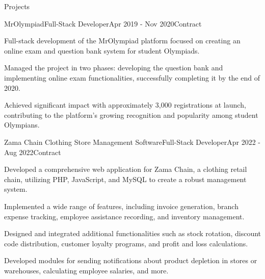\documentclass[]{kyvernitis-resume}
\begin{document}
\begin{section}{Projects}
    \begin{subsection}{MrOlympiad}{Full-Stack Developer}{Apr 2019 - Nov 2020}{Contract}{}
		\item Full-stack development of the MrOlympiad platform  
 focused on creating an online exam and question bank system for student Olympiads.
		\item Managed the project in two phases: developing the question bank and implementing online exam functionalities, successfully completing it by the end of 2020.
		\item Achieved significant impact with approximately 3,000 registrations at launch, contributing to the platform’s growing recognition and popularity among student Olympians.

    \end{subsection}
    \begin{subsection}{Zama Chain Clothing Store Management Software}{Full-Stack Developer}{Apr 2022 - Aug 2022}{Contract}{}
		\item Developed a comprehensive web application for Zama Chain, a clothing retail chain, utilizing PHP, JavaScript, and MySQL to create a robust management system.
		\item Implemented a wide range of features, including invoice generation, branch expense tracking, employee assistance recording, and inventory management.
		\item Designed and integrated additional functionalities such as stock rotation, discount code distribution, customer loyalty programs, and profit and loss calculations.
		\item Developed modules for sending notifications about product depletion in stores or warehouses, calculating employee salaries, and more.


\end{subsection}
\end{section}
\end{document}
